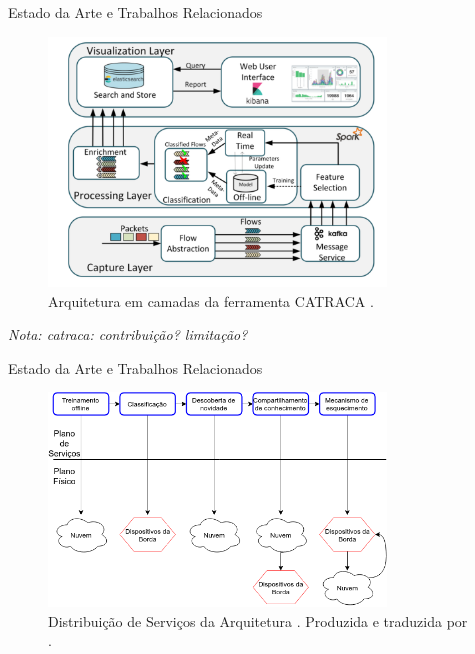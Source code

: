 \documentclass[aspectratio=43,10pt]{beamer}
\newcommand{\nota}[1]{\hspace*{-0.5cm}\textit{{\color[rgb]{1,0,0}Nota: #1}}}
\begin{document}
\begin{frame}[fragile]{Estado da Arte e Trabalhos Relacionados}
\begin{figure}[ht]
  \centering
  \includegraphics[width=0.8\textwidth]{figuras/catraca-arch.png}
  \caption{Arquitetura em camadas da ferramenta CATRACA \cite{Lopez2018}.}
  \label{fig:catraca}
\end{figure}
\nota{catraca: contribuição? limitação?}
\end{frame}

\begin{frame}[fragile]{Estado da Arte e Trabalhos Relacionados}
\begin{figure}[ht]
  \centering
  \includegraphics[width=0.8\textwidth]{figuras/idsa-iot-quali-004.png}
  \caption{Distribuição de Serviços da Arquitetura \idsiot.
  Produzida e traduzida por .}
  \label{fig:ids-iot}
\end{figure}
\end{frame}

\newcommand{\mfog}{sistema M-FOG\xspace}
\end{document}
